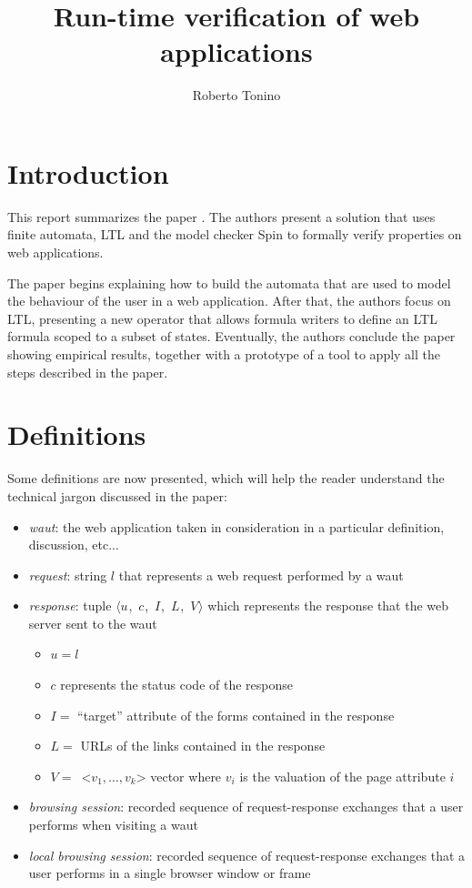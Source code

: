 \documentclass[a4paper,10pt]{article}
\title{Run-time verification of web applications}
\author{Roberto Tonino}
\newcommand{\res}[1][]{
  \ifthenelse{\equal{#1}{}}{\mbox{$\langle u$, $c$, $I$, $L$, $V\rangle$}}
  {\mbox{$\langle u_{#1}$, $c_{#1}$, $I_{#1}$, $L_{#1}$, $V_{#1}\rangle$}}
}
\theoremstyle{plain} %
\theoremstyle{definition}
\theoremstyle{remark}
\begin{document}
\maketitle

\tableofcontents

\clearpage

\section{Introduction}

This report summarizes the paper . The authors present a solution that uses finite automata, LTL and the model checker Spin to formally verify properties on web applications.

The paper begins explaining how to build the automata that are used to model the behaviour of the user in a web application. After that, the authors focus on LTL, presenting a new operator that allows formula writers to define an LTL formula scoped to a subset of states. Eventually, the authors conclude the paper showing empirical results, together with a prototype of a tool to apply all the steps described in the paper.

\section{Definitions}

Some definitions are now presented, which will help the reader understand the technical jargon discussed in the paper:

\begin{itemize}
  \item \textit{\gls{waut}}: the web application taken in consideration in a particular definition, discussion, etc...
  \item \textit{request}: string $l$ that represents a web request performed by a \gls{waut}
  \item \textit{response}: tuple \res which represents the response that the web server sent to the \gls{waut}
    \begin{itemize}
      \item $u = l$
      \item $c$ represents the status code of the response \cite{Fielding2022}
      \item $I =$ ``target'' attribute of the forms contained in the response
      \item $L =$ URLs of the links contained in the response
      \item $V =$\ <$v_1,\dots,v_k$> vector where $v_i$ is the valuation of the page attribute $i$
    \end{itemize}
  \item \textit{browsing session}: recorded sequence of request-response exchanges that a user performs when visiting a \gls{waut}
  \item \textit{local browsing session}: recorded sequence of request-response exchanges that a user performs in a single browser window or frame
\end{itemize}
\end{document}
